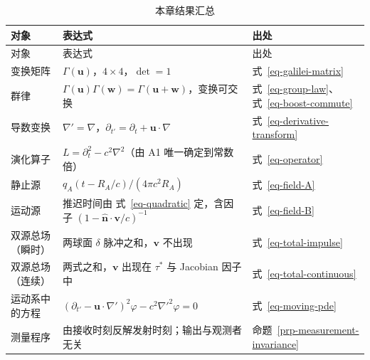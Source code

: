 \documentclass[
  chinese,
  a4paper,
  UTF8,
  12pt,
  oneside,
  openany]{ctexbook}
\theoremstyle{plain}
\theoremstyle{plain}
\theoremstyle{plain}
\theoremstyle{definition}
\theoremstyle{plain}
\theoremstyle{plain}
\theoremstyle{remark}
\begin{document}
\begin{longtable}[]{@{}
  >{\raggedright\arraybackslash}p{}
  >{\raggedright\arraybackslash}p{}
  >{\raggedright\arraybackslash}p{}@{}}
\caption{本章结果汇总}\label{tbl-summary}\tabularnewline
\toprule\noalign{}
\begin{minipage}[b]{\linewidth}\raggedright
对象
\end{minipage} & \begin{minipage}[b]{\linewidth}\raggedright
表达式
\end{minipage} & \begin{minipage}[b]{\linewidth}\raggedright
出处
\end{minipage} \\
\midrule\noalign{}
\endfirsthead
\toprule\noalign{}
\begin{minipage}[b]{\linewidth}\raggedright
对象
\end{minipage} & \begin{minipage}[b]{\linewidth}\raggedright
表达式
\end{minipage} & \begin{minipage}[b]{\linewidth}\raggedright
出处
\end{minipage} \\
\midrule\noalign{}
\endhead
\bottomrule\noalign{}
\endlastfoot
变换矩阵 & \(\Gamma(\mathbf{u})\)，\(4\times4\)，\(\det=1\) &
式~\ref{eq-galilei-matrix} \\
群律 &
\(\Gamma(\mathbf{u})\Gamma(\mathbf{w})=\Gamma(\mathbf{u}+\mathbf{w})\)，变换可交换
& 式~\ref{eq-group-law}、式~\ref{eq-boost-commute} \\
导数变换 &
\(\nabla'=\nabla\)，\(\partial_{t'}=\partial_{t}+\mathbf{u}\cdot\nabla\)
& 式~\ref{eq-derivative-transform} \\
演化算子 & \(L=\partial_{t}^{2}-c^{2}\nabla^{2}\)（由 A1
唯一确定到常数倍） & 式~\ref{eq-operator} \\
静止源 & \(q_{A}(t-R_{A}/c)/(4\pi c^{2}R_{A})\) & 式~\ref{eq-field-A} \\
运动源 & 推迟时间由 式~\ref{eq-quadratic} 定，含因子
\((1-\hat{\mathbf{n}}\cdot\mathbf{v}/c)^{-1}\) & 式~\ref{eq-field-B} \\
双源总场（瞬时） & 两球面 \(\delta\) 脉冲之和，\(\mathbf{v}\) 不出现 &
式~\ref{eq-total-impulse} \\
双源总场（连续） & 两式之和，\(\mathbf{v}\) 出现在 \(\tau^{*}\) 与
Jacobian 因子中 & 式~\ref{eq-total-continuous} \\
运动系中的方程 &
\((\partial_{t'}-\mathbf{u}\cdot\nabla')^{2}\varphi-c^{2}\nabla'^{2}\varphi=0\)
& 式~\ref{eq-moving-pde} \\
测量程序 & 由接收时刻反解发射时刻；输出与观测者无关 &
命题~\ref{prp-measurement-invariance} \\
\end{longtable}
\end{document}
